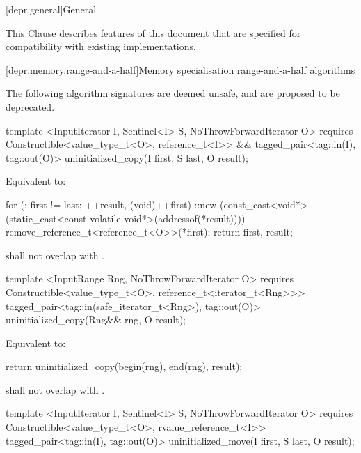 
[depr.general]{General}

\pnum
This Clause describes features of this document that are specified for compatibility with existing
implementations.

[depr.memory.range-and-a-half]{Memory specialisation range-and-a-half algorithms}
{\color{addclr}
\pnum
The following algorithm signatures are deemed unsafe, and are proposed to be deprecated.

\begin{codeblock}
template <InputIterator I, Sentinel<I> S, NoThrowForwardIterator O>
requires
  Constructible<value_type_t<O>, reference_t<I>> &&
tagged_pair<tag::in(I), tag::out(O)>
  uninitialized_copy(I first, S last, O result);
\end{codeblock}

\pnum
\effects Equivalent to:
\begin{codeblock}
    for (; first != last; ++result, (void)++first) {
      ::new (const_cast<void*>(static_cast<const volatile void*>(addressof(*result))))
        remove_reference_t<reference_t<O>>(*first);
    }
    return {first, result};
\end{codeblock}

\pnum
\requires {} shall not overlap with
.


\begin{codeblock}
template <InputRange Rng, NoThrowForwardIterator O>
  requires
Constructible<value_type_t<O>, reference_t<iterator_t<Rng>>>
  tagged_pair<tag::in(safe_iterator_t<Rng>), tag::out(O)>
uninitialized_copy(Rng&& rng, O result);
\end{codeblock}

\pnum
\effects Equivalent to:
\begin{codeblock}
   return uninitialized_copy(begin(rng), end(rng), result);
\end{codeblock}

\pnum
\requires {} shall not overlap with
.

\begin{codeblock}
template <InputIterator I, Sentinel<I> S, NoThrowForwardIterator O>
  requires
Constructible<value_type_t<O>, rvalue_reference_t<I>>
  tagged_pair<tag::in(I), tag::out(O)>
uninitialized_move(I first, S last, O result);
\end{codeblock}

}
